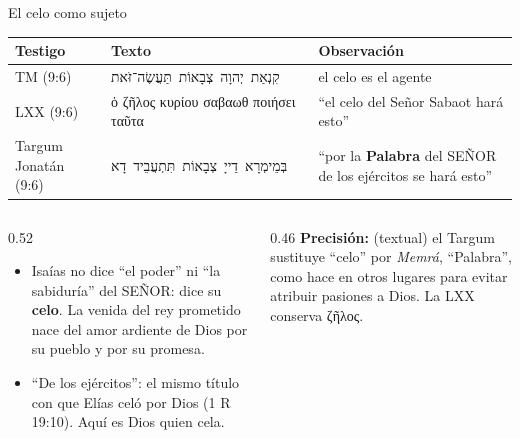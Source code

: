 \documentclass[hyperref={bookmarks=false},aspectratio=169]{beamer}
\newcommand{\heb}[1]{\mbox{\foreignlanguage{hebrew}{#1}}}
\newcommand{\grc}[1]{\foreignlanguage{ancientgreek}{#1}}
\newcommand{\SENOR}{S{\fontsize{0.78em}{1em}\selectfont EÑOR}}
\newcommand{\destacar}[1]{\textbf{\textcolor{azul}{#1}}}
\newcommand{\precision}[1]{{\footnotesize\color{gris}\textbf{Precisión:} #1}}
\begin{document}
\begin{frame}{El celo como sujeto}
\scriptsize\renewcommand{\arraystretch}{1.2}
\begin{tabular}{@{}>{\RaggedRight\arraybackslash}p{2.4cm}>{\RaggedRight\arraybackslash}p{5.0cm}>{\RaggedRight\arraybackslash}p{4.4cm}@{}}
\toprule
\textbf{Testigo} & \textbf{Texto} & \textbf{Observación} \\ \midrule
TM (9:6) & \heb{קִנְאַת יְהוָה צְבָאוֹת תַּעֲשֶׂה־זֹּאת} & el celo es el agente \\
LXX (9:6) & \grc{ὁ ζῆλος κυρίου σαβαωθ ποιήσει ταῦτα} & ``el celo del Señor Sabaot hará esto'' \\
Targum Jonatán (9:6) & \heb{בְּמֵימְרָא דַייָ צְבָאוֹת תִּתְעֲבֵיד דָא} & ``por la \destacar{Palabra} del \SENOR{} de los ejércitos se hará esto'' \\
\bottomrule
\end{tabular}\par\medskip
\begin{columns}[t,onlytextwidth]
\begin{column}{0.52\textwidth}\small
\begin{itemize}
\item Isaías no dice ``el poder'' ni ``la sabiduría'' del \SENOR: dice su \destacar{celo}. La venida del rey prometido nace del amor ardiente de Dios por su pueblo y por su promesa.
\item ``De los ejércitos'': el mismo título con que Elías celó por Dios (1 R 19:10). Aquí es Dios quien cela.
\end{itemize}
\end{column}
\begin{column}{0.46\textwidth}
\precision{(textual) el Targum sustituye ``celo'' por \emph{Memrá}, ``Palabra'', como hace en otros lugares para evitar atribuir pasiones a Dios. La LXX conserva \grc{ζῆλος}.}
\end{column}
\end{columns}
\end{frame}
\end{document}
